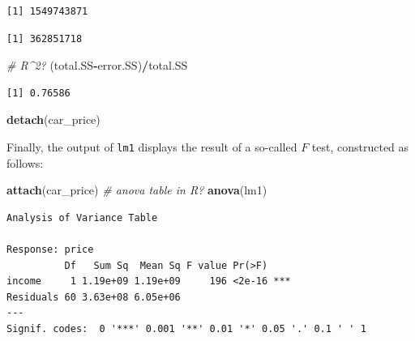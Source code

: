\documentclass[
]{book}
\newenvironment{Shaded}{\begin{snugshade}}{\end{snugshade}}
\newcommand{\CommentTok}[1]{\textcolor[rgb]{0.56,0.35,0.01}{\textit{#1}}}
\newcommand{\DecValTok}[1]{\textcolor[rgb]{0.00,0.00,0.81}{#1}}
\newcommand{\KeywordTok}[1]{\textcolor[rgb]{0.13,0.29,0.53}{\textbf{#1}}}
\newcommand{\NormalTok}[1]{#1}
\newcommand{\OperatorTok}[1]{\textcolor[rgb]{0.81,0.36,0.00}{\textbf{#1}}}
\newcommand{\StringTok}[1]{\textcolor[rgb]{0.31,0.60,0.02}{#1}}
\begin{document}
\begin{verbatim}
[1] 1549743871
\end{verbatim}

\begin{Shaded}
\end{Shaded}

\begin{verbatim}
[1] 362851718
\end{verbatim}

\begin{Shaded}
\begin{Highlighting}[]
\CommentTok{# R^2?}
\NormalTok{(total.SS}\OperatorTok{-}\NormalTok{error.SS)}\OperatorTok{/}\NormalTok{total.SS}
\end{Highlighting}
\end{Shaded}

\begin{verbatim}
[1] 0.76586
\end{verbatim}

\begin{Shaded}
\begin{Highlighting}[]
\KeywordTok{detach}\NormalTok{(car_price)}
\end{Highlighting}
\end{Shaded}

Finally, the output of \texttt{lm1} displays the result of a so-called \(F\) test, constructed as follows:

\begin{Shaded}
\begin{Highlighting}[]
\KeywordTok{attach}\NormalTok{(car_price)}
\CommentTok{# anova table in R?}
\KeywordTok{anova}\NormalTok{(lm1)}
\end{Highlighting}
\end{Shaded}

\begin{verbatim}
Analysis of Variance Table

Response: price
          Df   Sum Sq  Mean Sq F value Pr(>F)    
income     1 1.19e+09 1.19e+09     196 <2e-16 ***
Residuals 60 3.63e+08 6.05e+06                   
---
Signif. codes:  0 '***' 0.001 '**' 0.01 '*' 0.05 '.' 0.1 ' ' 1
\end{verbatim}
\end{document}
